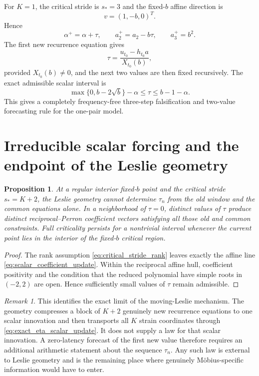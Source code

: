 \documentclass[11pt]{amsart}
\numberwithin{equation}{section}
\theoremstyle{plain}
\newtheorem{proposition}[theorem]{Proposition}
\theoremstyle{definition}
\theoremstyle{remark}
\newtheorem{remark}[theorem]{Remark}
\begin{document}
For $K=1$, the critical stride is $s_*=3$ and the fixed-$b$ affine direction is
\begin{equation}
v=(1,-b,0)^T.
\label{eq:K1_direction}
\end{equation}
Hence
\begin{equation}
\alpha^+=\alpha+\tau,
\qquad
a_2^+=a_2-b\tau,
\qquad
a_3^+=b^2.
\label{eq:K1_scalar_update}
\end{equation}
The first new recurrence equation gives
\begin{equation}
\tau
=
\frac{u_{t_0}-h_{t_0}a}{X_{t_0}(b)},
\label{eq:K1_tau}
\end{equation}
provided $X_{t_0}(b)\neq0$, and the next two values are then fixed recursively.  The exact admissible scalar interval is
\begin{equation}
\boxed{
\max\{0,b-2\sqrt b\}-\alpha
\leq\tau
\leq
b-1-\alpha.
}
\label{eq:K1_tau_interval}
\end{equation}
This gives a completely frequency-free three-step falsification and two-value forecasting rule for the one-pair model.

\section{Irreducible scalar forcing and the endpoint of the Leslie geometry}
\label{sec:irreducible_scalar_forcing}

\begin{proposition}
\label{prop:irreducible_scalar_forcing}
At a regular interior fixed-$b$ point and the critical stride $s_*=K+2$, the Leslie geometry cannot determine $\tau_n$ from the old window and the common equations alone.  In a neighborhood of $\tau=0$, distinct values of $\tau$ produce distinct reciprocal--Perron coefficient vectors satisfying all those old and common constraints.  Full criticality persists for a nontrivial interval whenever the current point lies in the interior of the fixed-$b$ critical region.
\end{proposition}

\begin{proof}
The rank assumption \eqref{eq:critical_stride_rank} leaves exactly the affine line \eqref{eq:scalar_coefficient_update}.  Within the reciprocal affine hull, coefficient positivity and the condition that the reduced polynomial have simple roots in $(-2,2)$ are open.  Hence sufficiently small values of $\tau$ remain admissible.
\end{proof}

\begin{remark}
\label{rem:true_remaining_problem}
This identifies the exact limit of the moving-Leslie mechanism.  The geometry compresses a block of $K+2$ genuinely new recurrence equations to one scalar innovation and then transports all $K$ strain coordinates through \eqref{eq:exact_eta_scalar_update}.  It does not supply a law for that scalar innovation.  A zero-latency forecast of the first new value therefore requires an additional arithmetic statement about the sequence $\tau_n$.  Any such law is external to Leslie geometry and is the remaining place where genuinely Möbius-specific information would have to enter.
\end{remark}
\end{document}
